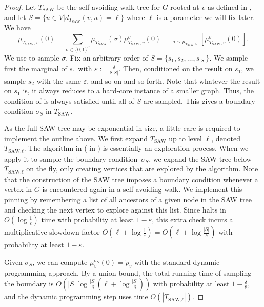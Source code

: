 \documentclass[11pt]{amsart}
\newcommand{\Ex}{\mathop{\mathbb{{}E}}\nolimits}
\newcommand{\abs}[1]{\ensuremath{\left\vert#1\right\vert}}
\newcommand{\eps}{\varepsilon}
\newcommand{\defeq}{:=}
\theoremstyle{definition}
\theoremstyle{remark}
\newcommand{\TSAW}{T_{\mathrm{SAW}}}
\begin{document}
\begin{proof}
Let $\TSAW$ be the self-avoiding walk tree for $G$ rooted at $v$ as defined in , and let $S=\{u\in V|d_{\TSAW}(v,u)=\ell\}$ where $\ell$ is a parameter we will fix later. We have
\[\mu_{\TSAW,v}(0)=\sum_{\sigma\in\{0,1\}^S}\mu_{\TSAW}(\sigma)\mu_{\TSAW,v}^\sigma(0)=\Ex_{\sigma\sim\mu_{\TSAW,S}}[\mu_{\TSAW,v}^\sigma(0)].\]
We use  to sample $\sigma$.
Fix an arbitrary order of $S=\{s_1,s_2,\ldots,s_{\abs{S}}\}$.
We sample first the marginal of $s_1$ with $\eps\defeq\frac{\delta}{8\abs{S}}$.
Then, conditioned on the result on $s_1$, we sample $s_2$ with the same $\eps$, and so on and so forth.
Note that whatever the result on $s_1$ is, it always reduces to a hard-core instance of a smaller graph.
Thus, the condition of  is always satisfied until all of $S$ are sampled.
This gives a boundary condition $\sigma_S$ in $\TSAW$.

As the full SAW tree may be exponential in size,
a little care is required to implement the outline above.
We first expand $\TSAW$ up to level $\ell$, denoted $T_\textrm{SAW,$\ell$}$. %
The algorithm in  ( in ) is essentially an exploration process.
When we apply it to sample the boundary condition~$\sigma_S$,
we expand the SAW tree below $T_\textrm{SAW,$\ell$}$ on the fly,
only creating vertices that are explored by the algorithm.
Note that the construction of the SAW tree imposes a boundary condition whenever a vertex in $G$ is encountered again in a self-avoiding walk.
We implement this pinning by remembering a list of all ancestors of a given node in the SAW tree and checking the next vertex to explore against this list.
Since  halts in $O(\log\frac{1}{\eps})$ time with probability at least $1-\eps$,
this extra check incurs a multiplicative slowdown factor $O(\ell+\log\frac{1}{\eps})=O(\ell+\log\frac{\abs{S}}{\delta})$ with probability at least $1-\eps$. 

Given $\sigma_S$, we can compute $\mu_v^{\sigma_S}(0)=\widetilde{p}_v$ with the standard dynamic programming approach.
By a union bound, the total running time of sampling the boundary is $O(\abs{S}\log\frac{\abs{S}}{\delta}(\ell+\log\frac{\abs{S}}{\delta}))$ with probability at least $1-\frac{\delta}{8}$,
  and the dynamic programming step uses time $O(\abs{T_\textrm{SAW,$\ell$}})$.


\end{proof}
\end{document}
